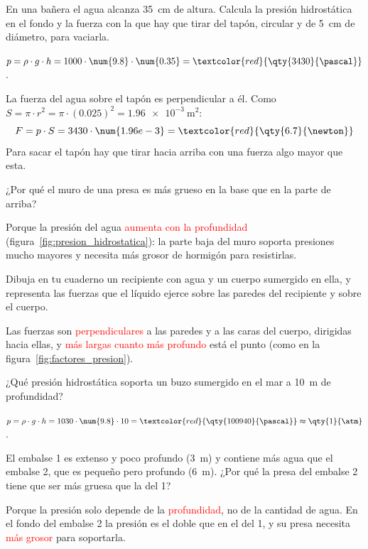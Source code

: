\begin{example}
    En una bañera el agua alcanza \qty{35}{\cm} de altura. Calcula la presión hidrostática en el fondo y la fuerza con la que hay que tirar del tapón, circular y de \qty{5}{\cm} de diámetro, para vaciarla.

    \(p = \rho \cdot g \cdot h = 1000 \cdot \num{9.8} \cdot \num{0.35} = \textcolor{red}{\qty{3430}{\pascal}}\).

    La fuerza del agua sobre el tapón es perpendicular a él. Como \(S = \pi \cdot r^2 = \pi \cdot (\num{0.025})^2 = \qty{1.96e-3}{\square\m}\):
    \[ F = p \cdot S = 3430 \cdot \num{1.96e-3} = \textcolor{red}{\qty{6.7}{\newton}} \]
    Para sacar el tapón hay que tirar hacia arriba con una fuerza algo mayor que esta.
\end{example}

\begin{example}
    ¿Por qué el muro de una presa es más grueso en la base que en la parte de arriba?

    Porque la presión del agua \textcolor{red}{aumenta con la profundidad} (figura~\ref{fig:presion_hidrostatica}): la parte baja del muro soporta presiones mucho mayores y necesita más grosor de hormigón para resistirlas.
\end{example}

\begin{exercise}
    Dibuja en tu cuaderno un recipiente con agua y un cuerpo sumergido en ella, y representa las fuerzas que el líquido ejerce sobre las paredes del recipiente y sobre el cuerpo.
    \begin{solu}
        Las fuerzas son \textcolor{red}{perpendiculares} a las paredes y a las caras del cuerpo, dirigidas hacia ellas, y \textcolor{red}{más largas cuanto más profundo} está el punto (como en la figura~\ref{fig:factores_presion}).
    \end{solu}
\end{exercise}

\begin{exercise}
    ¿Qué presión hidrostática soporta un buzo sumergido en el mar a \qty{10}{\m} de profundidad?
    \begin{solu}
        \(p = \rho \cdot g \cdot h = 1030 \cdot \num{9.8} \cdot 10 = \textcolor{red}{\qty{100940}{\pascal}} \approx \qty{1}{\atm}\).
    \end{solu}
\end{exercise}

\begin{exercise}
    El embalse 1 es extenso y poco profundo (\qty{3}{\m}) y contiene más agua que el embalse 2, que es pequeño pero profundo (\qty{6}{\m}). ¿Por qué la presa del embalse 2 tiene que ser más gruesa que la del 1?
    \begin{solu}
        Porque la presión solo depende de la \textcolor{red}{profundidad}, no de la cantidad de agua. En el fondo del embalse 2 la presión es el doble que en el del 1, y su presa necesita \textcolor{red}{más grosor} para soportarla.
    \end{solu}
\end{exercise}

